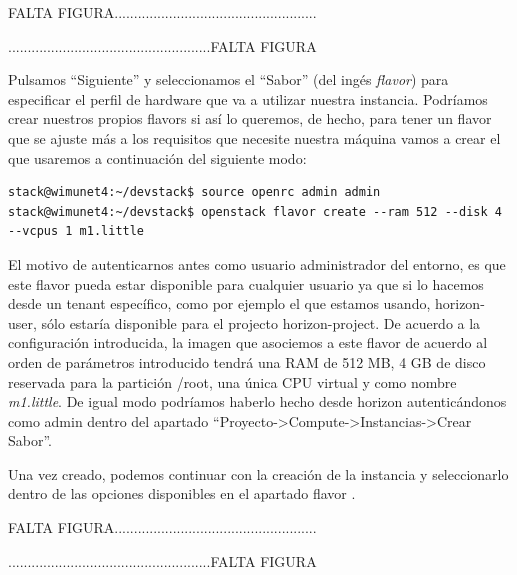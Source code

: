 \begin{tcolorbox}[colback=green!5!white,colframe=green!75!black]
FALTA FIGURA....................................................

....................................................FALTA FIGURA
\end{tcolorbox}

Pulsamos “Siguiente” y seleccionamos el “Sabor” (del ingés \textit{flavor}) para especificar el perfil de hardware que va a utilizar nuestra instancia. Podríamos crear nuestros propios flavors si así lo queremos, de hecho, para tener un flavor que se ajuste más a los requisitos que necesite nuestra máquina vamos a crear el que usaremos a continuación del siguiente modo:

\begin{lstlisting}[style=Consola]
stack@wimunet4:~/devstack$ source openrc admin admin
stack@wimunet4:~/devstack$ openstack flavor create --ram 512 --disk 4 --vcpus 1 m1.little
\end{lstlisting}

El motivo de autenticarnos antes como usuario administrador del entorno, es que este flavor pueda estar disponible para cualquier usuario ya que si lo hacemos desde un tenant específico, como por ejemplo el que estamos usando, horizon-user, sólo estaría disponible para el projecto horizon-project. De acuerdo a la configuración introducida, la imagen que asociemos a este flavor de acuerdo al orden de parámetros introducido tendrá una RAM de 512 MB, 4 GB de disco reservada para la partición /root, una única CPU virtual y como nombre \textit{m1.little}. De igual modo podríamos haberlo hecho desde horizon autenticándonos como admin dentro del apartado “Proyecto-\textgreater Compute-\textgreater Instancias-\textgreater Crear Sabor”. 

Una vez creado, podemos continuar con la creación de la instancia y seleccionarlo dentro de las opciones disponibles en el apartado flavor %
.

\begin{tcolorbox}[colback=green!5!white,colframe=green!75!black]
FALTA FIGURA....................................................

....................................................FALTA FIGURA
\end{tcolorbox}


